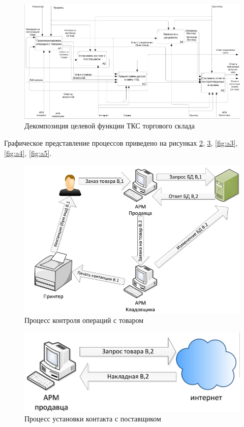 \begin{figure}
  \includegraphics[width=\linewidth]{appendix/a0_2.png}
  \caption{Декомпозиция целевой функции ТКС торгового склада}
  \label{fig:idef0-inside}
\end{figure}
\clearpage

Графическое представление процессов приведено на рисунках \ref{fig:a1}, \ref{fig:a2}, \ref{fig:a3}, \ref{fig:a4}, \ref{fig:a5}.

\begin{figure}[H]
  \centering
  \includegraphics[width=\linewidth]{sec1/img/a1.png}
  \caption{Процесс контроля операций с товаром}
  \label{fig:a1}
\end{figure}

\begin{figure}[H]
  \centering
  \includegraphics[width=\linewidth]{sec1/img/a2.png}
  \caption{Процесс установки контакта с поставщиком}
  \label{fig:a2}
\end{figure}

